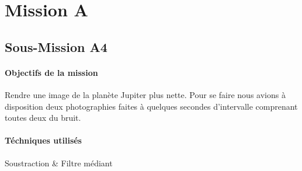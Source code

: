 \documentclass{article}
\begin{document}
\section{Mission A}

\subsection{Sous-Mission A4}

\begin{vwcol}[widths={0.8,0.2}, rule=0pt]
\begin{minipage}{0.7\textwidth}
\paragraph{Objectifs de la mission}

Rendre une image de la planète Jupiter plus nette. Pour se faire nous avions à disposition deux photographies faites à quelques secondes d'intervalle comprenant toutes deux du bruit.
\end{minipage}
\begin{minipage}{0.3\textwidth}
\begin{flushright}
\paragraph{Téchniques utilisés}

Soustraction \& Filtre médiant
\end{flushright}
\end{minipage}
\end{vwcol} 
\end{document}
